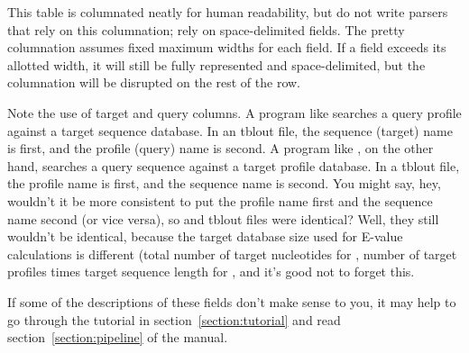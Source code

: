 This table is columnated neatly for human readability, but do not
write parsers that rely on this columnation; rely on space-delimited
fields. The pretty columnation assumes fixed maximum widths for each
field. If a field exceeds its allotted width, it will still be fully
represented and space-delimited, but the columnation will be disrupted
on the rest of the row.

Note the use of target and query columns. A program like
 searches a query profile against a target sequence
database. In an  tblout file, the sequence (target)
name is first, and the profile (query) name is second. A program like
, on the other hand, searches a query sequence against a
target profile database. In a  tblout file, the profile
name is first, and the sequence name is second. You might say, hey,
wouldn't it be more consistent to put the profile name first and the
sequence name second (or vice versa), so  and
 tblout files were identical? Well, they
still wouldn't be identical, because the target database size used for
E-value calculations is different (total number of target nucleotides
for , number of target profiles times target sequence
length for , and it's good not to forget this.

If some of the descriptions of these fields don't make sense to you,
it may help to go through the tutorial in
section~\ref{section:tutorial} and read section~\ref{section:pipeline}
of the manual. 
